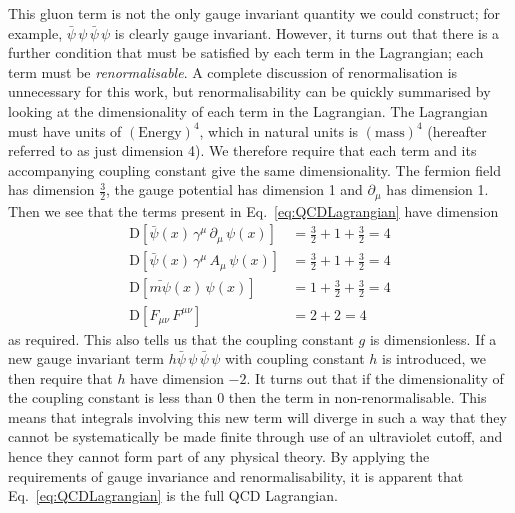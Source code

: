 This gluon term is not the only gauge invariant quantity we could construct; for example, $\bar{\psi}\,\psi\,\bar{\psi}\,\psi$ is clearly gauge invariant. However, it turns out that there is a further condition that must be satisfied by each term in the Lagrangian; each term must be \textit{renormalisable}\cite{peskin2018introduction}. A complete discussion of renormalisation is unnecessary for this work, but renormalisability can be quickly summarised by looking at the dimensionality of each term in the Lagrangian. The Lagrangian must have units of $(\text{Energy})^4$, which in natural units is $(\text{mass})^4$ (hereafter referred to as just dimension 4). We therefore require that each term and its accompanying coupling constant give the same dimensionality. The fermion field has dimension $\frac{3}{2}$, the gauge potential has dimension 1 and $\partial_\mu$ has dimension 1. Then we see that the terms present in Eq.~\ref{eq:QCDLagrangian} have dimension
%
\begin{align*}
\text{D}[\bar{\psi}(x)\,\gamma^\mu\,\partial_\mu\,\psi(x)]&=\frac{3}{2}+1+\frac{3}{2}=4\\
\text{D}[\bar{\psi}(x)\,\gamma^\mu\,A_\mu\,\psi(x)]&=\frac{3}{2}+1+\frac{3}{2}=4\\
\text{D}[\bar{m\psi}(x)\,\psi(x)]&=1+\frac{3}{2}+\frac{3}{2}=4\\
\text{D}[F_{\mu\nu}\,F^{\mu\nu}] &= 2+2=4
\end{align*}
%
as required. This also tells us that the coupling constant $g$ is dimensionless. If a new gauge invariant term $h\bar{\psi}\,\psi\,\bar{\psi}\,\psi$ with coupling constant $h$ is introduced, we then require that $h$ have dimension $-2$. It turns out that if the dimensionality of the coupling constant is less than 0 then the term in non-renormalisable. This means that integrals involving this new term will diverge in such a way that they cannot be systematically be made finite through use of an ultraviolet cutoff, and hence they cannot form part of any physical theory. By applying the requirements of gauge invariance and renormalisability, it is apparent that Eq.~\ref{eq:QCDLagrangian} is the full QCD Lagrangian.

